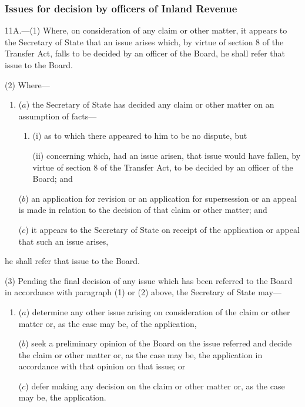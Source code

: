 \documentclass[12pt,a4paper]{article}
\begin{document}
\subsubsection[11A. Issues for decision by officers of Inland Revenue]{Issues for decision by officers of Inland Revenue}

11A.---(1)  Where, on consideration of any claim or other matter, it appears to the Secretary of State that an issue arises which, by virtue of section 8 of the Transfer Act, falls to be decided by an officer of the Board, he shall refer that issue to the Board.

(2) Where—
\begin{enumerate}\item[]
($a$) the Secretary of State has decided any claim or other matter on an assumption of facts—
\begin{enumerate}\item[]
(i) as to which there appeared to him to be no dispute, but

(ii) concerning which, had an issue arisen, that issue would have fallen, by virtue of section 8 of the Transfer Act, to be decided by an officer of the Board; and
\end{enumerate}

($b$) an application for revision or an application for supersession 
or an appeal  %
is made in relation to the decision of that claim or other matter; and

\pagebreak[3]

($c$) it appears to the Secretary of State on 
receipt of the application or appeal  %
that such an issue arises,
\end{enumerate}
he shall refer that issue to the Board.

(3) Pending the final decision of any issue which has been referred to the Board in accordance with paragraph (1) or (2) above, the Secretary of State may—
\begin{enumerate}\item[]
($a$) determine any other issue arising on consideration of the claim or other matter or, as the case may be, of the application,

($b$) seek a preliminary opinion of the Board on the issue referred and decide the claim or other matter or, as the case may be, the application in accordance with that opinion on that issue; or

($c$) defer making any decision on the claim or other matter or, as the case may be, the application.
\end{enumerate}
\end{document}

